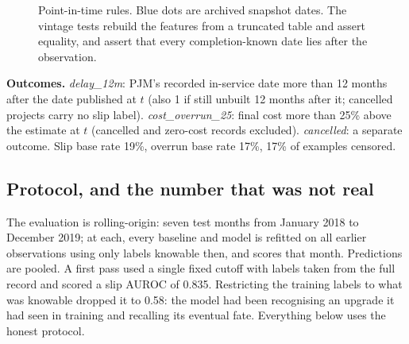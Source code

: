 \documentclass[11pt,a4paper]{article}
\begin{document}
\begin{figure}[h]
\centering
{}
\caption{Point-in-time rules. Blue dots are archived snapshot dates. The vintage tests rebuild the features from a truncated table and assert equality, and assert that every completion-known date lies after the observation.}
\end{figure}

\textbf{Outcomes.} \emph{delay\_12m}: PJM's recorded in-service date more than 12 months after the date published at $t$
(also 1 if still unbuilt 12 months after it; cancelled projects carry no slip label). \emph{cost\_overrun\_25}: final cost
more than 25\% above the estimate at $t$ (cancelled and zero-cost records excluded). \emph{cancelled}: a separate outcome.
Slip base rate 19\%, overrun base rate 17\%, 17\% of examples censored.

\subsection*{Protocol, and the number that was not real}

The evaluation is rolling-origin: seven test months from January 2018 to December 2019; at each, every baseline and
model is refitted on all earlier observations using only labels knowable then, and scores that month. Predictions are
pooled. A first pass used a single fixed cutoff with labels taken from the full record and scored a slip AUROC of
0.835. Restricting the training labels to what was knowable dropped it to 0.58: the model had been recognising an
upgrade it had seen in training and recalling its eventual fate. Everything below uses the honest protocol.
\end{document}

